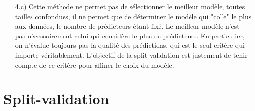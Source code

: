 \documentclass[a4paper, 12pt]{article}
\begin{document}
\begin{enumerate}
\item[4.c)] Cette méthode ne permet pas de sélectionner le meilleur modèle, toutes tailles confondues, il ne permet que de déterminer le modèle qui "colle" le plus aux données, le nombre de prédicteurs étant fixé. Le meilleur modèle n'est pas nécessairement celui qui considère le plus de prédicteurs. En particulier, on n'évalue toujours pas la qualité des prédictions, qui est le seul critère qui importe véritablement. L'objectif de la split-validation est justement de tenir compte de ce critère pour affiner le choix du modèle.

\end{enumerate}


\section{Split-validation}
\end{document}
